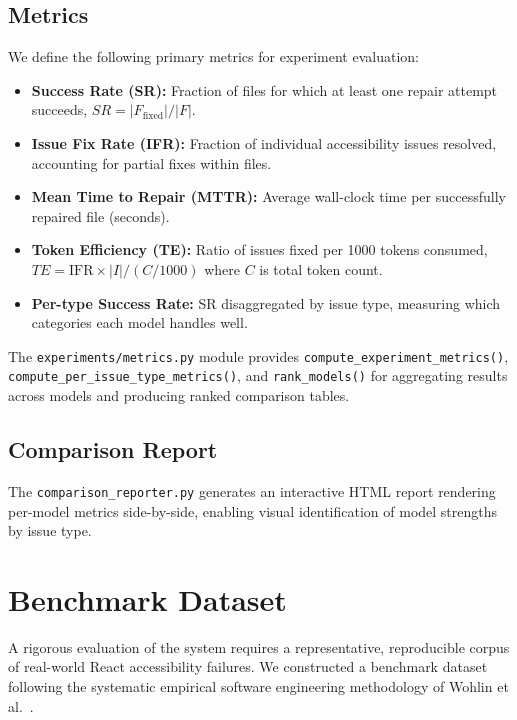 \documentclass[10pt,conference]{IEEEtran}
\begin{document}
\subsection{Metrics}

We define the following primary metrics for experiment evaluation:

\begin{itemize}
  \item \textbf{Success Rate (SR):} Fraction of files for which at least one
    repair attempt succeeds, $SR = |F_{\text{fixed}}| / |F|$.
  \item \textbf{Issue Fix Rate (IFR):} Fraction of individual accessibility
    issues resolved, accounting for partial fixes within files.
  \item \textbf{Mean Time to Repair (MTTR):} Average wall-clock time per
    successfully repaired file (seconds).
  \item \textbf{Token Efficiency (TE):} Ratio of issues fixed per 1000 tokens
    consumed, $TE = \text{IFR} \times |I| / (C / 1000)$ where $C$ is total
    token count.
  \item \textbf{Per-type Success Rate:} SR disaggregated by issue type,
    measuring which categories each model handles well.
\end{itemize}

The \texttt{experiments/metrics.py} module provides
\texttt{compute\_experiment\_metrics()}, \texttt{compute\_per\_issue\_type\_metrics()},
and \texttt{rank\_models()} for aggregating results across models and producing
ranked comparison tables.

\subsection{Comparison Report}

The \texttt{comparison\_reporter.py} generates an interactive HTML report
rendering per-model metrics side-by-side, enabling visual identification of
model strengths by issue type.

\section{Benchmark Dataset}
\label{sec:dataset}

A rigorous evaluation of the system requires a representative, reproducible
corpus of real-world React accessibility failures.  We constructed a benchmark
dataset following the systematic empirical software engineering methodology of
Wohlin et al.\ \cite{wohlin2012}.
\end{document}
